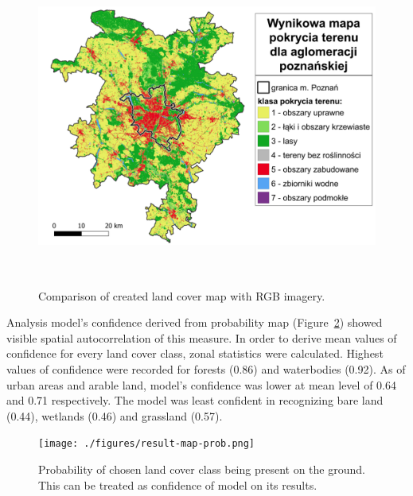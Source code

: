 \documentclass{amuthesis}
\begin{document}
\begin{figure}[t]

{\centering \includegraphics[width=5.875in,height=4.16667in]{./figures/result_map.png}

}

\caption{\label{fig-rycina10}Comparison of created land cover map with
RGB imagery.}

\end{figure}

Analysis model's confidence derived from probability map
(Figure~\ref{fig-rycina11}) showed visible spatial autocorrelation of
this measure. In order to derive mean values of confidence for every
land cover class, zonal statistics were calculated. Highest values of
confidence were recorded for forests (0.86) and waterbodies (0.92). As
of urban areas and arable land, model's confidence was lower at mean
level of 0.64 and 0.71 respectively. The model was least confident in
recognizing bare land (0.44), wetlands (0.46) and grassland (0.57).

\begin{figure}[t]

{\centering \texttt{[image: ./figures/result-map-prob.png]}

}

\caption{\label{fig-rycina11}Probability of chosen land cover class
being present on the ground. This can be treated as confidence of model
on its results.}

\end{figure}

\end{document}
